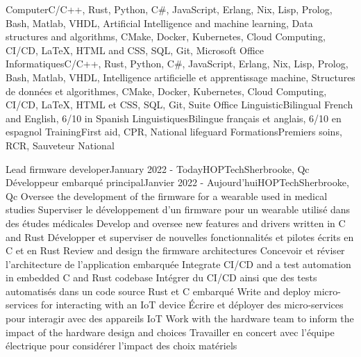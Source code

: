     \resumeEnumerationStart
        \resumeEnumerationEnFr
            {Computer}{C/C++, Rust, Python, C\#, JavaScript, Erlang, Nix, Lisp, Prolog, Bash, Matlab, VHDL, Artificial Intelligence and machine learning, Data structures and algorithms, CMake, Docker, Kubernetes, Cloud Computing, CI/CD, LaTeX, HTML and CSS, SQL, Git, Microsoft Office}
            {Informatiques}{C/C++, Rust, Python, C\#, JavaScript, Erlang, Nix, Lisp, Prolog, Bash, Matlab, VHDL, Intelligence artificielle et apprentissage machine, Structures de données et algorithmes, CMake, Docker, Kubernetes, Cloud Computing, CI/CD, LaTeX, HTML et CSS, SQL, Git, Suite Office}
        \resumeEnumerationEnFr
            {Linguistic}{Bilingual French and English, 6/10 in Spanish}
            {Linguistiques}{Bilingue français et anglais, 6/10 en espagnol}
        \resumeEnumerationEnFr
            {Training}{First aid, CPR, National lifeguard}
            {Formations}{Premiers soins, RCR, Sauveteur National}
    \resumeEnumerationEnd


  \resumeSubHeadingListStart
      \resumeSubheadingEnFr
        {Lead firmware developer}{January 2022 - Today}{HOPTech}{Sherbrooke, Qc}
        {Développeur embarqué principal}{Janvier 2022 - Aujourd'hui}{HOPTech}{Sherbrooke, Qc}
            \resumeItemListStart
                \resumeItemEnFr
                    {Oversee the development of the firmware for a wearable used in medical studies}
                    {Superviser le développement d'un firmware pour un wearable utilisé dans des études médicales}
                \resumeItemEnFr
                    {Develop and oversee new features and drivers written in C and Rust}
                    {Développer et superviser de nouvelles fonctionnalités et pilotes écrits en C et en Rust}
                \resumeItemEnFr
                    {Review and design the firmware architectures}
                    {Concevoir et réviser l'architecture de l'application embarquée}
                \resumeItemEnFr
                    {Integrate CI/CD and a test automation in embedded C and Rust codebase}
                    {Intégrer du CI/CD ainsi que des tests automatisés dans un code source Rust et C embarqué}
                \resumeItemEnFr
                    {Write and deploy micro-services for interacting with an IoT device}
                    {Écrire et déployer des micro-services pour interagir avec des appareils IoT}
                \resumeItemEnFr
                    {Work with the hardware team to inform the impact of the hardware design and choices}
                    {Travailler en concert avec l'équipe électrique pour considérer l'impact des choix matériels}
            \resumeItemListEnd
  
